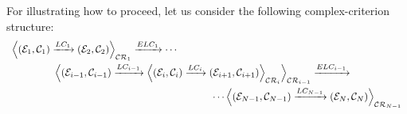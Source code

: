 \documentclass[a4paper,11pt] {article}
\begin{document}
For illustrating how to proceed, let us consider the following complex-criterion structure:
\begin{equation}\label{eq-CriterionStructure03}
\begin{array}{l}
\displaystyle \Big \langle (\mathcal E_1, \mathcal C_1) \xrightarrow{LC_1} 
(\mathcal E_2, \mathcal C_2) \Big \rangle_{\mathcal{CR}_1 } \xrightarrow{ELC_1} 
\cdots \vspace{1mm}
\\
\hspace{1.5cm} \displaystyle \Big \langle (\mathcal E_{i-1}, \mathcal C_{i-1}) \xrightarrow{LC_{i-1}}
\Big \langle
(\mathcal E_i, \mathcal C_i) \xrightarrow{LC_i}
(\mathcal E_{i+1}, \mathcal C_{i+1}) \Big\rangle_{\mathcal{CR}_{i} }  \Big \rangle_{\mathcal{CR}_{i-1}}  \xrightarrow{ELC_{i-1}}  \vspace{1mm} \\
 \hspace{7cm} \cdots \displaystyle \Big \langle (\mathcal E_{N-1}, \mathcal C_{N-1}) \xrightarrow{LC_{N-1}}
(\mathcal E_N, \mathcal C_N) \Big\rangle_{\mathcal{CR}_{N-1} } \\
\end{array}
\end{equation}
\end{document}
